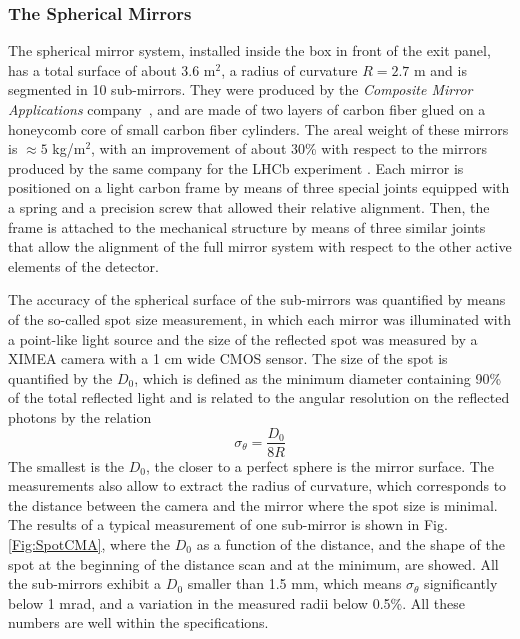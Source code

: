 \documentclass[5p,times,twocolumn]{elsarticle}
\begin{document}
\subsubsection{The Spherical Mirrors}


The spherical mirror system, installed inside the box in front of the exit panel, has a total surface of about 3.6 m$^2$, a radius of curvature $R= 2.7$ m and is segmented in 10 sub-mirrors.
They were produced by the {\it Composite Mirror Applications} company~\cite{REF:CMA}, and are made of two layers of carbon fiber glued on a honeycomb core of small carbon fiber cylinders.
The areal weight of these mirrors is $\approx 5$ kg/m$^2$, with an improvement of about 30\% with respect to the mirrors produced by the same company for the LHCb experiment \cite{REF:LHCbMirrors}.
Each mirror is positioned on a light carbon frame by means of three special joints equipped with a spring and a precision screw that allowed their relative alignment.
Then, the frame is attached to the mechanical structure by means of three similar joints that allow the alignment of the full mirror system with respect to the other active elements of the detector.

The accuracy of the spherical surface of the sub-mirrors was quantified by means of the so-called spot size measurement, in which each mirror was illuminated with a point-like light source and the size of the reflected spot was measured by a XIMEA camera with a 1 cm wide CMOS sensor.
The size of the spot is quantified by the $D_0$, which is defined as the minimum diameter containing 90\% of the total reflected light and is related to the angular resolution on the reflected photons by the relation
\begin{equation}
  \sigma_{\theta} = \frac{D_0}{8 R}
\end{equation}
The smallest is the $D_0$, the closer to a perfect sphere is the mirror surface.
The measurements also allow to extract the radius of curvature, which corresponds to the distance between the camera and the mirror where the spot size is minimal.
The results of a typical measurement of one sub-mirror is shown in Fig. \ref{Fig:SpotCMA}, where the $D_0$ as a function of the distance, and the shape of the spot at the beginning of the distance scan and at the minimum, are showed.
All the sub-mirrors exhibit a $D_0$ smaller than 1.5 mm, which means $\sigma_{\theta}$ significantly below 1 mrad, and a variation in the measured radii below 0.5\%. All these numbers are well within the specifications.
\end{document}
